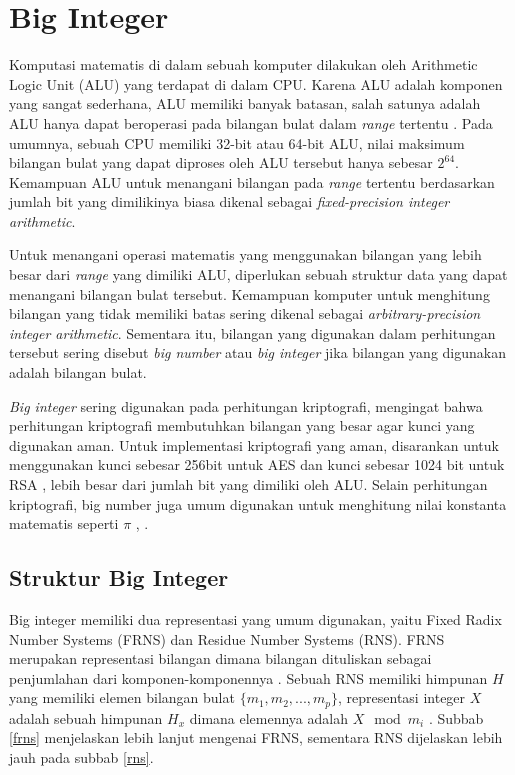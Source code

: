 \section{Big Integer}
Komputasi matematis di dalam sebuah komputer dilakukan oleh Arithmetic Logic Unit (ALU) yang terdapat di dalam CPU. Karena ALU adalah komponen yang sangat sederhana, ALU memiliki banyak batasan, salah satunya adalah ALU hanya dapat beroperasi pada bilangan bulat dalam \textit{range} tertentu \citep{comp_org_arch}. Pada umumnya, sebuah CPU memiliki 32-bit atau 64-bit ALU, nilai maksimum bilangan bulat yang dapat diproses oleh ALU tersebut hanya sebesar $2^{64}$. Kemampuan ALU untuk menangani bilangan pada \textit{range} tertentu berdasarkan jumlah bit yang dimilikinya biasa dikenal sebagai \textit{fixed-precision integer arithmetic}.

Untuk menangani operasi matematis yang menggunakan bilangan yang lebih besar dari \textit{range} yang dimiliki ALU, diperlukan sebuah struktur data yang dapat menangani bilangan bulat tersebut. Kemampuan komputer untuk menghitung bilangan yang tidak memiliki batas sering dikenal sebagai \textit{arbitrary-precision integer arithmetic}. Sementara itu, bilangan yang digunakan dalam perhitungan tersebut sering disebut \textit{big number} atau \textit{big integer} jika bilangan yang digunakan adalah bilangan bulat.

\textit{Big integer} sering digunakan pada perhitungan kriptografi, mengingat bahwa perhitungan kriptografi membutuhkan bilangan yang besar agar kunci yang digunakan aman. Untuk implementasi kriptografi yang aman, disarankan untuk menggunakan kunci sebesar 256bit untuk AES dan kunci sebesar 1024 bit untuk RSA \citep{key_suggestion}, lebih besar dari jumlah bit yang dimiliki oleh ALU. Selain perhitungan kriptografi, big number juga umum digunakan untuk menghitung nilai konstanta matematis seperti $\pi$ \citep{bn_pi}, .
\subsection{Struktur Big Integer}

Big integer memiliki dua representasi yang umum digunakan, yaitu Fixed Radix Number Systems (FRNS) dan Residue Number Systems (RNS). FRNS merupakan representasi bilangan dimana bilangan dituliskan sebagai penjumlahan dari komponen-komponennya \citep{modern_comp_math}. Sebuah RNS memiliki himpunan $H$ yang memiliki elemen bilangan bulat $\{m_1,m_2,...,m_p\}$, representasi integer $X$ adalah sebuah himpunan $H_x$ dimana elemennya adalah $X \mod m_i$ \citep{rns_survey}. Subbab \ref{frns} menjelaskan lebih lanjut mengenai FRNS, sementara RNS dijelaskan lebih jauh pada subbab \ref{rns}.

